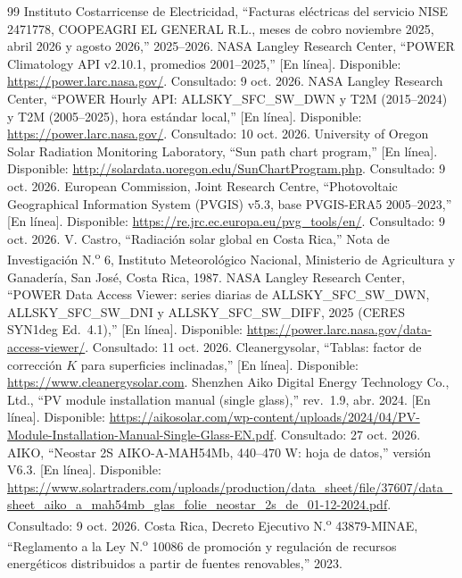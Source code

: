 \documentclass[10pt,letterpaper]{article}
\begin{document}
\begin{thebibliography}{99}
 Instituto Costarricense de Electricidad, ``Facturas eléctricas del servicio NISE 2471778, COOPEAGRI EL GENERAL R.L., meses de cobro noviembre 2025, abril 2026 y agosto 2026,'' 2025--2026.
 NASA Langley Research Center, ``POWER Climatology API v2.10.1, promedios 2001--2025,'' [En línea]. Disponible: \url{https://power.larc.nasa.gov/}. Consultado: 9 oct. 2026.
 NASA Langley Research Center, ``POWER Hourly API: ALLSKY\_SFC\_SW\_DWN y T2M (2015--2024) y T2M (2005--2025), hora estándar local,'' [En línea]. Disponible: \url{https://power.larc.nasa.gov/}. Consultado: 10 oct. 2026.
 University of Oregon Solar Radiation Monitoring Laboratory, ``Sun path chart program,'' [En línea]. Disponible: \url{http://solardata.uoregon.edu/SunChartProgram.php}. Consultado: 9 oct. 2026.
 European Commission, Joint Research Centre, ``Photovoltaic Geographical Information System (PVGIS) v5.3, base PVGIS-ERA5 2005--2023,'' [En línea]. Disponible: \url{https://re.jrc.ec.europa.eu/pvg_tools/en/}. Consultado: 9 oct. 2026.
 V. Castro, ``Radiación solar global en Costa Rica,'' Nota de Investigación N.\textsuperscript{o} 6, Instituto Meteorológico Nacional, Ministerio de Agricultura y Ganadería, San José, Costa Rica, 1987.
 NASA Langley Research Center, ``POWER Data Access Viewer: series diarias de ALLSKY\_SFC\_SW\_DWN, ALLSKY\_SFC\_SW\_DNI y ALLSKY\_SFC\_SW\_DIFF, 2025 (CERES SYN1deg Ed.~4.1),'' [En línea]. Disponible: \url{https://power.larc.nasa.gov/data-access-viewer/}. Consultado: 11 oct. 2026.
 Cleanergysolar, ``Tablas: factor de corrección $K$ para superficies inclinadas,'' [En línea]. Disponible: \url{https://www.cleanergysolar.com}.
 Shenzhen Aiko Digital Energy Technology Co., Ltd., ``PV module installation manual (single glass),'' rev.~1.9, abr. 2024. [En línea]. Disponible: \url{https://aikosolar.com/wp-content/uploads/2024/04/PV-Module-Installation-Manual-Single-Glass-EN.pdf}. Consultado: 27 oct. 2026.
 AIKO, ``Neostar 2S AIKO-A-MAH54Mb, 440--470 W: hoja de datos,'' versión V6.3. [En línea]. Disponible: \url{https://www.solartraders.com/uploads/production/data_sheet/file/37607/data_sheet_aiko_a_mah54mb_glas_folie_neostar_2s_de_01-12-2024.pdf}. Consultado: 9 oct. 2026.
 Costa Rica, Decreto Ejecutivo N.\textsuperscript{o} 43879-MINAE, ``Reglamento a la Ley N.\textsuperscript{o} 10086 de promoción y regulación de recursos energéticos distribuidos a partir de fuentes renovables,'' 2023.

\end{thebibliography}
\end{document}
